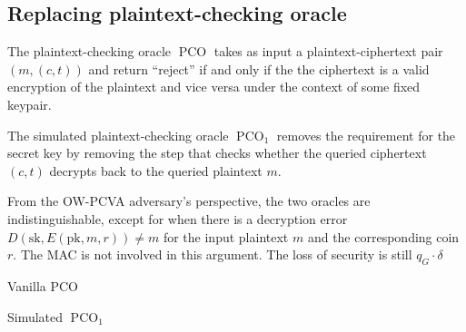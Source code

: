 \documentclass{article}
\begin{document}
\subsection{Replacing plaintext-checking oracle}\label{replacing-pco}
The plaintext-checking oracle $\operatorname{PCO}$ takes as input a plaintext-ciphertext pair $(m, (c, t))$ and return ``reject'' if and only if the the ciphertext is a valid encryption of the plaintext and vice versa under the context of some fixed keypair.

The simulated plaintext-checking oracle $\operatorname{PCO}_1$ removes the requirement for the secret key by removing the step that checks whether the queried ciphertext $(c, t)$ decrypts back to the queried plaintext $m$.

From the OW-PCVA adversary's perspective, the two oracles are indistinguishable, except for when there is a decryption error $D(\text{sk}, E(\text{pk}, m, r)) \neq m$ for the input plaintext $m$ and the corresponding coin $r$. The MAC is not involved in this argument. The loss of security is still $q_G\cdot\delta$

\begin{multicols}{2}
    \begin{algorithm}[H]
        \SetAlgoLined
        \caption{Vanilla PCO}
    \end{algorithm}

    \columnbreak

    \begin{algorithm}[H]
        \SetAlgoLined
        \caption{Simulated $\operatorname{PCO}_1$}
    \end{algorithm}
\end{multicols}
\end{document}
